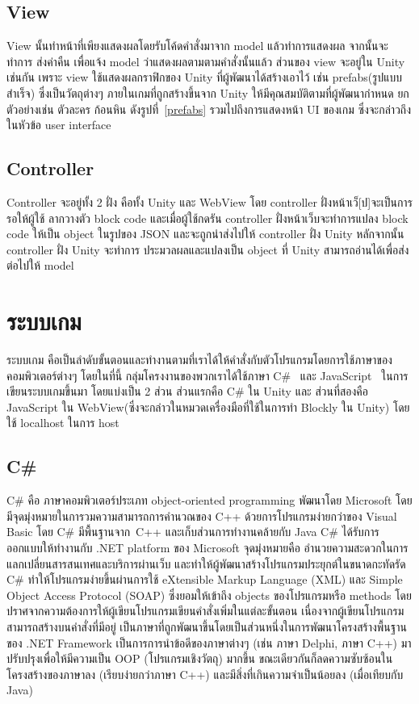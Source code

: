  \subsection{View}
 View นั้นทำหน้าที่เพียงแสดงผลโดยรับโค้ดคำสั่งมาจาก model แล้วทำการแสดงผล จากนั้นจะทำการ
 ส่งค่าคืน เพื่อแจ้ง model ว่าแสดงผลตามตามคำสั่งนั้นแล้ว ส่วนของ view จะอยู่ใน
 Unity เช่นกัน เพราะ view ใช้แสดงผลกราฟิกของ Unity ที่ผู้พัฒนาได้สร้างเอาไว้ เช่น prefabs(รูปแบบสำเร็จ) 
 ซึ่งเป็นวัตถุต่างๆ ภายในเกมที่ถูกสร้างขึ้นจาก Unity ให้มีคุณสมบัติตามที่ผู้พัฒนากำหนด ยกตัวอย่างเช่น ตัวละคร ก้อนหิน ดังรูปที่~\ref{prefabs}
 รวมไปถึงการแสดงหน้า UI ของเกม ซึ่งจะกล่าวถึงในหัวข้อ user interface
    

\subsection{Controller}
Controller จะอยู่ทั้ง 2 ฝั่ง คือทั้ง Unity และ WebView โดย controller ฝั่งหน้าเว็[ป]จะเป็นการรอให้ผู้ใช้
ลากวางตัว block code และเมื่อผู้ใช้กดรัน controller ฝั่งหน้าเว็บจะทำการแปลง block code ให้เป็น object 
ในรูปของ JSON และจะถูกนำส่งไปให้ controller ฝั่ง Unity หลักจากนั้น controller ฝั่ง Unity จะทำการ
ประมวลผลและแปลงเป็น object ที่ Unity สามารถอ่านได้เพื่อส่งต่อไปให้ model


\section{ระบบเกม}
ระบบเกม คือเป็นลำดับขั้นตอนและทำงานตามที่เราได้ให้คำสั่งกับตัวโปรแกรมโดยการใช้ภาษาของคอมพิวเตอร์ต่างๆ 
โดยในที่นี้ กลุ่มโครงงานของพวกเราได้ใช้ภาษา C\#~\cite{cs} และ JavaScript~\cite{js}
ในการเขียนระบบเกมขึ้นมา โดยแบ่งเป็น 2 ส่วน ส่วนแรกคือ C\# ใน Unity 
และ ส่วนที่สองคือ JavaScript ใน WebView(ซึ่งจะกล่าวในหมวดเครื่องมือที่ใช้ในการทำ Blockly ใน Unity) โดยใช้ localhost ในการ host

\subsection{C\#}
C\# คือ ภาษาคอมพิวเตอร์ประเภท object-oriented programming พัฒนาโดย Microsoft โดยมีจุดมุ่งหมายในการวมความสามารถการคำนวณของ 
C++ ด้วยการโปรแกรมง่ายกว่าของ Visual Basic โดย C\# มีพื้นฐานจาก 
C++ และเก็บส่วนการทำงานคล้ายกับ Java 
C\# ได้รับการออกแบบให้ทำงานกับ .NET platform ของ Microsoft
จุดมุ่งหมายคือ อำนวยความสะดวกในการแลกเปลี่ยนสารสนเทศและบริการผ่านเว็บ 
และทำให้ผู้พัฒนาสร้างโปรแกรมประยุกต์ในขนาดกะทัดรัด C\# 
ทำให้โปรแกรมง่ายขึ้นผ่านการใช้ eXtensible Markup Language (XML) 
และ Simple Object Access Protocol (SOAP) 
ซึ่งยอมให้เข้าถึง objects ของโปรแกรมหรือ methods 
โดยปราศจากความต้องการให้ผู้เขียนโปรแกรมเขียนคำสั่งเพิ่มในแต่ละขั้นตอน 
เนื่องจากผู้เขียนโปรแกรมสามารถสร้างบนคำสั่งที่มีอยู่ 
 เป็นภาษาที่ถูกพัฒนาขึ้นโดยเป็นส่วนหนึ่งในการพัฒนาโครงสร้างพื้นฐานของ
.NET Framework เป็นการการนำข้อดีของภาษาต่างๆ 
(เช่น ภาษา Delphi, ภาษา C++) มาปรับปรุงเพื่อให้มีความเป็น OOP 
(โปรแกรมเชิงวัตถุ) มากขึ้น ขณะเดียวกันก็ลดความซับซ้อนในโครงสร้างของภาษาลง (เรียบง่ายกว่าภาษา C++) 
และมีสิ่งที่เกินความจำเป็นน้อยลง (เมื่อเทียบกับ Java)~\cite{cs}

